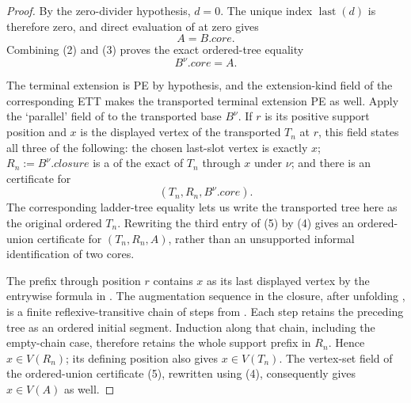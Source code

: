 \begin{proof}
By the zero-divider hypothesis, $d=0$.  The unique index
$\operatorname{last}(d)$ is therefore zero, and direct evaluation of
 at zero gives
\[
                       A=B.\mathit{core}.                       \tag{3}
\]
Combining (2) and (3) proves the exact ordered-tree equality
\[
                       B^\nu.\mathit{core}=A.                   \tag{4}
\]

The terminal extension is PE by hypothesis, and the extension-kind field
of the corresponding ETT makes the transported terminal extension PE as
well.  Apply the `parallel' field of  to the
transported base $B^\nu$.  If $r$ is its positive support position and
$x$ is the displayed vertex of the transported $T_n$ at $r$, this field
states all three of the following: the chosen last-slot vertex is exactly
$x$; $R_n:=B^\nu.\mathit{closure}$ is a
 of the exact
 of $T_n$ through $x$ under $\nu$; and there
is an  certificate for
\[
             (T_n,R_n,B^\nu.\mathit{core}).                    \tag{5}
\]
The corresponding ladder-tree equality lets us write the transported
tree here as the original ordered $T_n$.  Rewriting the third entry of
(5) by (4) gives an ordered-union certificate for $(T_n,R_n,A)$, rather
than an unsupported informal identification of two cores.

The prefix through position $r$ contains $x$ as its last displayed
vertex by the entrywise formula in .  The
augmentation sequence in the closure, after unfolding
, is a finite reflexive-transitive
chain of steps from .  Each step retains
the preceding tree as an ordered initial segment.  Induction along that
chain, including the empty-chain case, therefore retains the whole support
prefix in $R_n$.  Hence $x\in V(R_n)$; its defining position also gives
$x\in V(T_n)$.  The vertex-set field of the ordered-union certificate (5),
rewritten using (4), consequently gives $x\in V(A)$ as well.


\end{proof}
